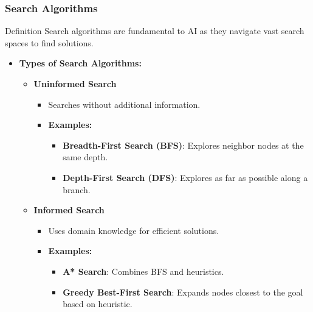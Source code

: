 \documentclass[aspectratio=169]{beamer}
\begin{document}
\begin{frame}[fragile]
    \frametitle{Search Algorithms}
    \begin{block}{Definition}
        Search algorithms are fundamental to AI as they navigate vast search spaces to find solutions.
    \end{block}

    \begin{itemize}
        \item \textbf{Types of Search Algorithms:}
        \begin{itemize}
            \item \textbf{Uninformed Search}
            \begin{itemize}
                \item Searches without additional information.
                \item \textbf{Examples:}
                \begin{itemize}
                    \item \textbf{Breadth-First Search (BFS)}: Explores neighbor nodes at the same depth.
                    \item \textbf{Depth-First Search (DFS)}: Explores as far as possible along a branch.
                \end{itemize}
            \end{itemize}

            \item \textbf{Informed Search}
            \begin{itemize}
                \item Uses domain knowledge for efficient solutions.
                \item \textbf{Examples:}
                \begin{itemize}
                    \item \textbf{A* Search}: Combines BFS and heuristics.
                    \item \textbf{Greedy Best-First Search}: Expands nodes closest to the goal based on heuristic.
                \end{itemize}
            \end{itemize}
        \end{itemize}
    \end{itemize}
\end{frame}
\end{document}
